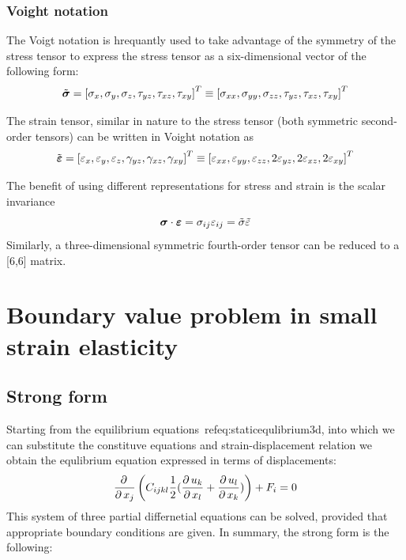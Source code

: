 \subsubsection{Voight notation}

The Voigt notation is hrequantly used to take advantage of the symmetry of the stress tensor to express the stress tensor as a six-dimensional vector of the following form:
$$
\tilde{\mbox{\boldmath$\sigma$}}=
\left[
  \sigma_{x}, \sigma_y, \sigma_z, \tau_{yz}, \tau_{xz}, \tau_{xy}
  \right]^T \equiv
\left[
  \sigma_{xx}, \sigma_{yy}, \sigma_{zz}, \tau_{yz}, \tau_{xz}, \tau_{xy}
  \right]^T
$$

The strain tensor, similar in nature to the stress tensor (both symmetric second-order tensors) can be written in Voight notation as
$$
\tilde{\mbox{\boldmath$\varepsilon $}}=
\left[
  \varepsilon_{x}, \varepsilon_y, \varepsilon_z, \gamma_{yz}, \gamma_{xz}, \gamma_{xy}
  \right]^T \equiv
\left[
  \varepsilon_{xx}, \varepsilon_{yy}, \varepsilon_{zz}, 2\varepsilon_{yz}, 2\varepsilon_{xz}, 2\varepsilon_{xy}
  \right]^T
$$

The benefit of using different representations for stress and strain is the scalar invariance
$$
\mbox{\boldmath$\sigma$}\cdot\mbox{\boldmath$\varepsilon$}=\sigma_{ij}\varepsilon_{ij}=\tilde\sigma \tilde{\varepsilon}
$$
Similarly, a three-dimensional symmetric fourth-order tensor can be reduced to a [6,6] matrix.


\section {Boundary value problem in small strain elasticity}
\subsection{Strong form}

Starting from the equilibrium equations~ref{eq:staticequlibrium3d}, into which we can substitute the constituve equations and strain-displacement relation we obtain the equlibrium equation expressed in terms of displacements:
$$
\mbox{$\displaystyle\frac{\partial \,{}}{\partial \,{x_j}}$}\left({C_{ijkl} {1\over 2}(\mbox{$\displaystyle\frac{\partial \,{u_k}}{\partial \,{x_l}}$}+\mbox{$\displaystyle\frac{\partial \,{u_l}}{\partial \,{x_k}}$})}\right) + F_i = 0
$$
This system of three partial differnetial equations can be solved, provided that appropriate boundary conditions are given. In summary, the strong form is the following:\\
\begin{center}
\end{center}

